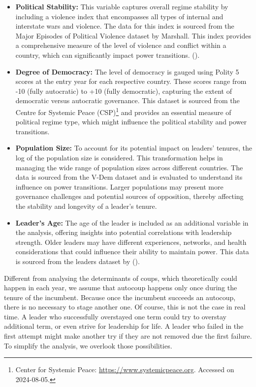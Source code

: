 \documentclass[
  12pt,
]{report}
\begin{document}
\begin{itemize}
\item
  \textbf{Political Stability:} This variable captures overall regime
  stability by including a violence index that encompasses all types of
  internal and interstate wars and violence. The data for this index is
  sourced from the Major Episodes of Political Violence dataset by
  Marshall. This index provides a comprehensive measure of the level of
  violence and conflict within a country, which can significantly impact
  power transitions. ().
\item
  \textbf{Degree of Democracy:} The level of democracy is gauged using
  Polity 5 scores at the entry year for each respective country. These
  scores range from -10 (fully autocratic) to +10 (fully democratic),
  capturing the extent of democratic versus autocratic governance. This
  dataset is sourced from the Centre for Systemic Peace (CSP)\footnote{Center
    for Systemic Peace: \url{https://www.systemicpeace.org}. Accessed on
    2024-08-05.} and provides an essential measure of political regime
  type, which might influence the political stability and power
  transitions.
\item
  \textbf{Population Size:} To account for its potential impact on
  leaders' tenures, the log of the population size is considered. This
  transformation helps in managing the wide range of population sizes
  across different countries. The data is sourced from the V-Dem dataset
  and is evaluated to understand its influence on power transitions.
  Larger populations may present more governance challenges and
  potential sources of opposition, thereby affecting the stability and
  longevity of a leader's tenure.
\item
  \textbf{Leader's Age:} The age of the leader is included as an
  additional variable in the analysis, offering insights into potential
  correlations with leadership strength. Older leaders may have
  different experiences, networks, and health considerations that could
  influence their ability to maintain power. This data is sourced from
  the leaders dataset by ().
\end{itemize}

Different from analysing the determinants of coups, which theoretically
could happen in each year, we assume that autocoup happens only once
during the tenure of the incumbent. Because once the incumbent succeeds
an autocoup, there is no necessary to stage another one. Of course, this
is not the case in real time. A leader who successfully overstayed one
term could try to overstay additional term, or even strive for
leadership for life. A leader who failed in the first attempt might make
another try if they are not removed due the first failure. To simplify
the analysis, we overlook those possibilities.
\end{document}
